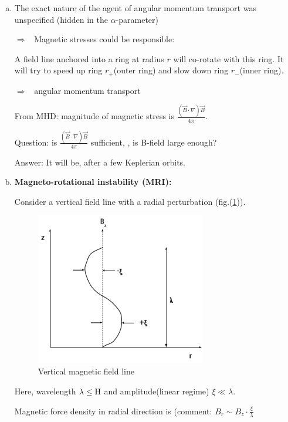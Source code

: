 \begin{enumerate}[a)]
   \item The exact nature of the agent of angular momentum transport was unspecified (hidden in the $\alpha$-parameter)

   $\Rightarrow$~ Magnetic stresses could be responsible:

   A field line anchored into a ring at radius $r$ will co-rotate with this ring. It will try to speed up ring $r_{+}$(outer ring)
   and slow down ring $r_{-}$(inner ring).

   $\Rightarrow$~ angular momentum transport

   From MHD: magnitude of magnetic stress is $\frac{(\vec{B}\cdot\nabla)\vec{B}}{4\pi}$.

   Question: is $\frac{(\vec{B}\cdot\nabla)\vec{B}}{4\pi}$ sufficient, \ie, is B-field large enough?

   Answer: It will be, after a few Keplerian orbits.

   \item \textbf{Magneto-rotational instability (MRI):}

   Consider a vertical field line with a radial perturbation (fig.(\ref{fig:mrivt})).

\begin{figure}[!htbp]
   \centering
   \includegraphics[width=0.7\textwidth]{HighEnergy/mrivt}
   \caption{Vertical magnetic field line}
   \label{fig:mrivt}
\end{figure}

   Here, wavelength $\lambda \le \rm H$ and amplitude(linear regime) $\xi \ll \lambda$.

   Magnetic force density in radial direction is (comment: $B_{r} \sim B_{z} \cdot \frac{\xi}{\lambda}$


\end{enumerate}
